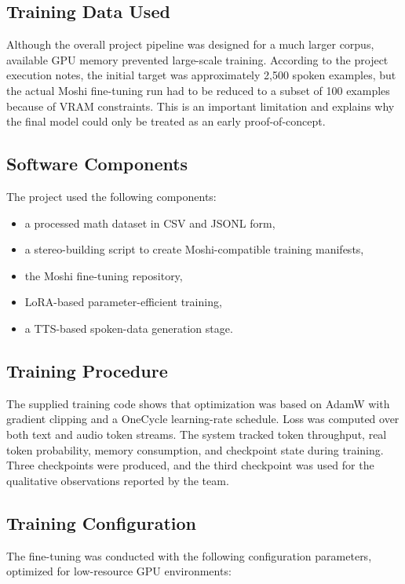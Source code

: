 \documentclass[12pt,a4paper]{article}
\begin{document}
\subsection{Training Data Used}
Although the overall project pipeline was designed for a much larger corpus, available GPU memory prevented large-scale training. According to the project execution notes, the initial target was approximately 2,500 spoken examples, but the actual Moshi fine-tuning run had to be reduced to a subset of 100 examples because of VRAM constraints. This is an important limitation and explains why the final model could only be treated as an early proof-of-concept.

\subsection{Software Components}
The project used the following components:
\begin{itemize}[leftmargin=1.5em]
    \item a processed math dataset in CSV and JSONL form,
    \item a stereo-building script to create Moshi-compatible training manifests,
    \item the Moshi fine-tuning repository,
    \item LoRA-based parameter-efficient training,
    \item a TTS-based spoken-data generation stage.
\end{itemize}

\subsection{Training Procedure}
The supplied training code shows that optimization was based on AdamW with gradient clipping and a OneCycle learning-rate schedule. Loss was computed over both text and audio token streams. The system tracked token throughput, real token probability, memory consumption, and checkpoint state during training. Three checkpoints were produced, and the third checkpoint was used for the qualitative observations reported by the team.

\subsection{Training Configuration}
The fine-tuning was conducted with the following configuration parameters, optimized for low-resource GPU environments:
\end{document}
